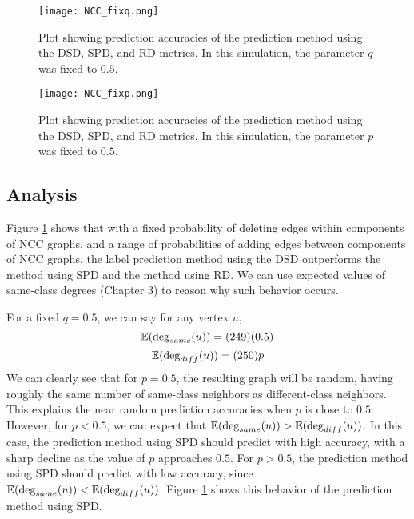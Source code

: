 \begin{figure}[h!]
\centering
\texttt{[image: NCC\_fixq.png]}
\caption{Plot showing prediction accuracies of the prediction method using the DSD, SPD, and RD metrics. In this simulation, the parameter $q$ was fixed to $0.5$.}
\label{fig:NCC_fixq}
\end{figure}

\begin{figure}[h!]
\centering
\texttt{[image: NCC\_fixp.png]}
\caption{Plot showing prediction accuracies of the prediction method using the DSD, SPD, and RD metrics. In this simulation, the parameter $p$ was fixed to $0.5$.}
\label{fig:NCC_fixp}
\end{figure}


\subsection{Analysis}
Figure \ref{fig:NCC_fixq} shows that with a fixed probability of deleting
edges within components of NCC graphs, and a range of probabilities of
adding edges between components of NCC graphs, the label prediction method
using the DSD outperforms the method using SPD and the method using RD.
We can use expected values of same-class degrees (Chapter 3) to reason why
such behavior occurs.

For a fixed $q=0.5$, we can say for any vertex $u$,
$$\mathbb{E}(\deg_{same}(u)) = (249)(0.5)$$
$$\mathbb{E}(\deg_{diff}(u)) = (250)p$$
We can clearly see that for $p=0.5$, the resulting graph will be random,
having roughly the same number of same-class neighbors as different-class 
neighbors. This explains the near random prediction accuracies when $p$ is
close to $0.5$. However, for $p < 0.5$, we can expect that
$\mathbb{E}(\deg_{same}(u)) > \mathbb{E}(\deg_{diff}(u))$.
In this case, the prediction method using SPD should predict with high
accuracy, with a sharp decline as the value of $p$ approaches $0.5$. For 
$p > 0.5$, the prediction method using SPD should predict with low 
accuracy, since $\mathbb{E}(\deg_{same}(u)) < \mathbb{E}(\deg_{diff}(u))$. Figure
\ref{fig:NCC_fixq} shows this behavior of the prediction method using SPD.

